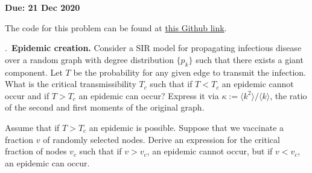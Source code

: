 \documentclass{letter}
\newcounter{problem}
\newcommand{\Problem}[2]{%
	\stepcounter{problem}%
	\leftskip=0pt%
	\theproblem.~\textbf{{#1.}} #2 \par%
}
\newcommand{\Due}[1]{\textbf{Due: #1} \par}
\begin{document}
    \Due{21 Dec 2020}

    The code for this problem can be found at \href{https://github.com/thoffman1/amsc808n/tree/master/final/problem2}{this Github link}.

    \Problem{Epidemic creation}{Consider a SIR model for propagating infectious disease over a random graph with degree distribution $\{p_k\}$ such that there exists a giant component. Let $T$ be the probability for any given edge to transmit the infection. What is the critical transmissibility $T_c$ such that if $T < T_c$ an epidemic cannot occur and if $T > T_c$ an epidemic can occur? Express it via $\kappa := \langle k^2 \rangle / \langle k \rangle$, the ratio of the second and first moments of the original graph. 
    
    Assume that if $T > T_c$ an epidemic is possible. Suppose that we vaccinate a fraction $v$ of randomly selected nodes. Derive an expression for the critical fraction of nodes $v_c$ such that if $v > v_c$, an epidemic cannot occur, but if $v < v_c$, an epidemic can occur.}
\end{document}
